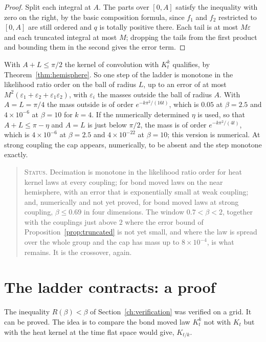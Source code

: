 \begin{proof}
Split each integral at $A$. The parts over $[0,A]$ satisfy the inequality with zero on the right, by the basic composition formula, since $f_1$ and $f_2$ restricted to $[0,A]$ are still ordered and $q$ is totally positive there. Each tail is at most $M\varepsilon$ and each truncated integral at most $M$; dropping the tails from the first product and bounding them in the second gives the error term.
\end{proof}

With $A+L\le\pi/2$ the kernel of convolution with $K_t^k$ qualifies, by Theorem~\ref{thm:hemisphere}. So one step of the ladder is monotone in the likelihood ratio order on the ball of radius $L$, up to an error of at most $M^2(\varepsilon_1+\varepsilon_2+\varepsilon_1\varepsilon_2)$, with $\varepsilon_i$ the masses outside the ball of radius $A$. With $A=L=\pi/4$ the mass outside is of order $e^{-k\pi^2/(16t)}$, which is $0.05$ at $\beta=2.5$ and $4\times10^{-6}$ at $\beta=10$ for $k=4$. If the numerically determined $\eta$ is used, so that $A+L\le\pi-\eta$ and $A=L$ is just below $\pi/2$, the mass is of order $e^{-k\pi^2/(4t)}$, which is $4\times10^{-6}$ at $\beta=2.5$ and $4\times10^{-22}$ at $\beta=10$; this version is numerical. At strong coupling the cap appears, numerically, to be absent and the step monotone exactly.

\begin{quote}
\textsc{Status.} Decimation is monotone in the likelihood ratio order for heat kernel laws at every coupling; for bond moved laws on the near hemisphere, with an error that is exponentially small at weak coupling; and, numerically and not yet proved, for bond moved laws at strong coupling, $\beta\le0.69$ in four dimensions. The window $0.7<\beta<2$, together with the couplings just above $2$ where the error bound of Proposition~\ref{prop:truncated} is not yet small, and where the law is spread over the whole group and the cap has mass up to $8\times10^{-4}$, is what remains. It is the crossover, again.
\end{quote}

\section{The ladder contracts: a proof}\label{sec:contracts}

The inequality $R(\beta)<\beta$ of Section~\ref{ch:verification} was verified on a grid. It can be proved. The idea is to compare the bond moved law $K_t^k$ not with $K_t$ but with the heat kernel at the time flat space would give, $K_{t/k}$.


